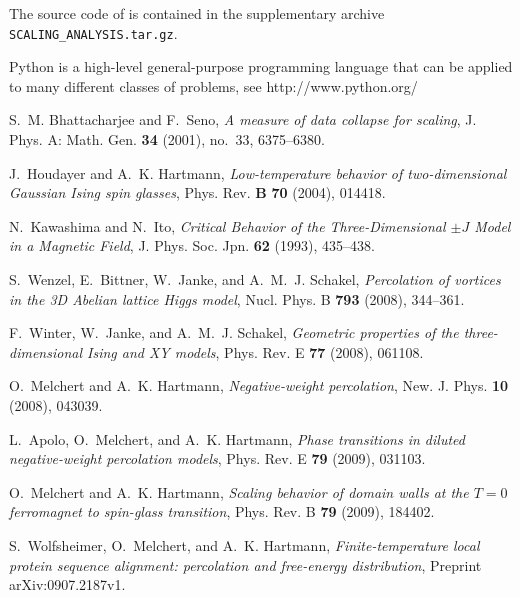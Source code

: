 \renewcommand*\bibname{References}
\begin{thebibliography}{10}
\label{ASARefs}
\addcontentsline{toc}{section}{\bibname}

	The source code of \myProg{} is contained in the supplementary archive {\tt SCALING\_ANALYSIS.tar.gz}.

	Python is a high-level general-purpose programming language that 
	can be applied to many different classes of problems,
	see http://www.python.org/

	S.~M. Bhattacharjee and F.~Seno, 
	\emph{{A measure of data collapse for scaling}}, 
	J. Phys. A: Math. Gen. \textbf{34} (2001), no.~33, 6375--6380.

	J.~Houdayer and A.~K. Hartmann, 
	\emph{{Low-temperature behavior of two-dimensional Gaussian Ising spin glasses}}, 
	Phys. Rev. {\bf B} \textbf{70} (2004), 014418.

	N.~Kawashima and N.~Ito, 
	\emph{{Critical Behavior of the Three-Dimensional $\pm J$ Model in a Magnetic Field}}, 
	J. Phys. Soc. Jpn. \textbf{62} (1993), 435--438.

	S.~Wenzel, E.~Bittner, W.~Janke, and A.~M.~J. Schakel, 
	\emph{{Percolation of vortices in the 3D Abelian lattice Higgs model}}, 
	Nucl. Phys. B \textbf{793} (2008), 344--361.

	F.~Winter, W.~Janke, and A.~M.~J. Schakel, 
	\emph{{Geometric properties of the three-dimensional Ising and XY models}}, 
	Phys. Rev. E \textbf{77} (2008), 061108.

	O.~Melchert and A.~K. Hartmann, 
	\emph{{Negative-weight percolation}}, 
	New. J. Phys. \textbf{10} (2008), 043039.

	L.~Apolo, O.~Melchert, and A.~K. Hartmann, 
	\emph{{Phase transitions in diluted negative-weight percolation models}}, 
	Phys. Rev. E \textbf{79} (2009), 031103.

	O.~Melchert and A.~K. Hartmann, 
	\emph{{Scaling behavior of domain walls at the $T=0$ ferromagnet to spin-glass transition}}, 
	Phys. Rev. B \textbf{79} (2009), 184402.

	S.~Wolfsheimer, O.~Melchert, and A.~K. Hartmann, 
	\emph{{Finite-temperature local protein sequence alignment: percolation and free-energy distribution}},
	Preprint arXiv:0907.2187v1.


\end{thebibliography}
